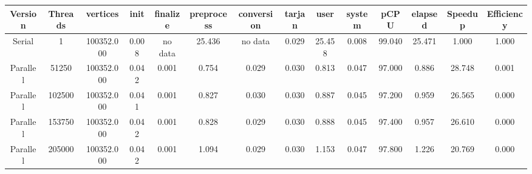\begin{tabular}{|c|c|c|c|c|c|c|c|c|c|c|c|c|c|}
\toprule
 Version &  Threads &   vertices &  init & finalize &  preprocess & conversion &  tarjan &   user &  system &   pCPU &  elapsed &  Speedup &  Efficiency \\
\midrule
  Serial &        1 & 100352.000 & 0.008 &  no data &      25.436 &    no data &   0.029 & 25.458 &   0.008 & 99.040 &   25.471 &    1.000 &       1.000 \\
Parallel &    51250 & 100352.000 & 0.042 &    0.001 &       0.754 &      0.029 &   0.030 &  0.813 &   0.047 & 97.000 &    0.886 &   28.748 &       0.001 \\
Parallel &   102500 & 100352.000 & 0.041 &    0.001 &       0.827 &      0.030 &   0.030 &  0.887 &   0.045 & 97.200 &    0.959 &   26.565 &       0.000 \\
Parallel &   153750 & 100352.000 & 0.042 &    0.001 &       0.828 &      0.029 &   0.030 &  0.888 &   0.045 & 97.400 &    0.957 &   26.610 &       0.000 \\
Parallel &   205000 & 100352.000 & 0.042 &    0.001 &       1.094 &      0.029 &   0.030 &  1.153 &   0.047 & 97.800 &    1.226 &   20.769 &       0.000 \\
\bottomrule
\end{tabular}
